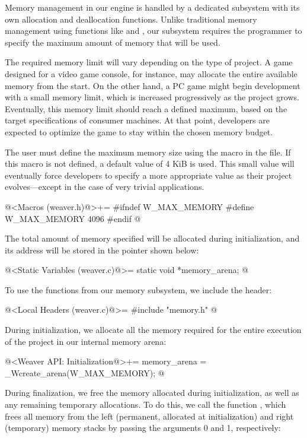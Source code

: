 
Memory management in our engine is handled by a dedicated subsystem
with its own allocation and deallocation functions. Unlike traditional
memory management using functions like 
and , our subsystem requires the programmer to
specify the maximum amount of memory that will be used.

The required memory limit will vary depending on the type of
project. A game designed for a video game console, for instance, may
allocate the entire available memory from the start. On the other
hand, a PC game might begin development with a small memory limit,
which is increased progressively as the project grows. Eventually,
this memory limit should reach a defined maximum, based on the target
specifications of consumer machines. At that point, developers are
expected to optimize the game to stay within the chosen memory budget.

The user must define the maximum memory size using
the  macro in the 
file. If this macro is not defined, a default value of 4 KiB is
used. This small value will eventually force developers to specify a
more appropriate value as their project evolves---except in the case of
very trivial applications.

\iniciocodigo
@<Macros (weaver.h)@>+=
#ifndef W_MAX_MEMORY
#define W_MAX_MEMORY 4096
#endif
@
\fimcodigo

The total amount of memory specified will be allocated during
initialization, and its address will be stored in the pointer shown
below:

\iniciocodigo
@<Static Variables (weaver.c)@>=
static void *memory_arena;
@
\fimcodigo

To use the functions from our memory subsystem, we include the header:

\iniciocodigo
@<Local Headers (weaver.c)@>=
#include "memory.h"
@
\fimcodigo

During initialization, we allocate all the memory required for the
entire execution of the project in our internal memory arena:

\iniciocodigo
@<Weaver API: Initialization@>+=
memory_arena = _Wcreate_arena(W_MAX_MEMORY);
@
\fimcodigo

During finalization, we free the memory allocated during
initialization, as well as any remaining temporary allocations. To do
this, we call the function , which frees all
memory from the left (permanent, allocated at initialization) and
right (temporary) memory stacks by passing the arguments 0 and 1,
respectively:

